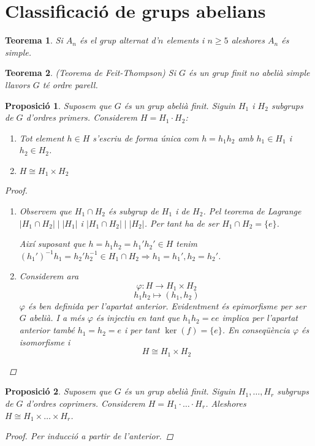 \documentclass[a4paper,11pt]{report}
\newcommand{\inv}[1]{#1^{-1}}
\renewcommand{\div}{\mid}
\newcommand{\ordre}[1]{|#1|}
\theoremstyle{theorem}
\newtheorem{proposicio}{\normalfont \sffamily\bfseries Proposició}[section]
\newtheorem{teorema}{\normalfont \sffamily\bfseries Teorema}[section]
\theoremstyle{definition}
\begin{document}
\section{Classificació de grups abelians}
\begin{teorema}
	Si $A_n$ és el grup alternat d'$n$ elements i $n\geq 5$ aleshores $A_n$ és simple. 
\end{teorema}
\begin{teorema} {(Teorema de Feit-Thompson)}
	Si $G$ és un grup finit no abelià simple llavors $G$ té ordre parell.
\end{teorema}
\begin{proposicio}
	Suposem que $G$ és un grup abelià finit. Siguin $H_1$ i $H_2$ subgrups de $G$ d'ordres primers. Considerem $H=H_1\cdot H_2$:
	\begin{enumerate}
		\item Tot element $h\in H$ s'escriu de forma única com $h=h_1h_2$ amb $h_1\in H_1$ i $h_2\in H_2$.
		\item $H\cong H_1\times H_2$
	\end{enumerate}
\begin{proof}
	\begin{enumerate}
		\item Observem que $H_1\cap H_2$ és subgrup de $H_1$ i de $H_2$. Pel teorema de Lagrange $\ordre{H_1\cap H_2}\div \ordre{H_1}$ i $\ordre{H_1\cap H_2}\div \ordre{H_2}$. 	Per tant ha de ser $H_1\cap H_2=\{e\}$. 
		
		Així suposant que $h=h_1h_2=h_1'h_2'\in H$ tenim $\inv{(h_1')}h_1=h_2'\inv{h_2}\in H_1\cap H_2\Rightarrow h_1=h_1',h_2=h_2'$.
		\item Considerem ara $$\varphi:H\longrightarrow H_1\times H_2$$ $$ h_1h_2\longmapsto (h_1,h_2)$$ 
		$\varphi$ és ben definida per l'apartat anterior. Evidentment és epimorfisme per ser $G$ abelià. I a més $\varphi$ és injectiu en tant que $h_1h_2=ee$ implica per l'apartat anterior també $h_1=h_2=e$ i per tant $\ker(f)=\{e\}$. En conseqüència $\varphi$ és isomorfisme i $$H\cong H_1\times H_2$$
	\end{enumerate}
\end{proof}
\end{proposicio}
\begin{proposicio}
	Suposem que $G$ és un grup abelià finit. Siguin $H_1,\ldots,H_r$ subgrups de $G$ d'ordres coprimers. Considerem $H=H_1\cdot\ldots\cdot H_r$. Aleshores $H\cong H_1\times\ldots\times H_r$.
	\begin{proof}
		Per inducció a partir de l'anterior.
	\end{proof}
\end{proposicio}
\end{document}
